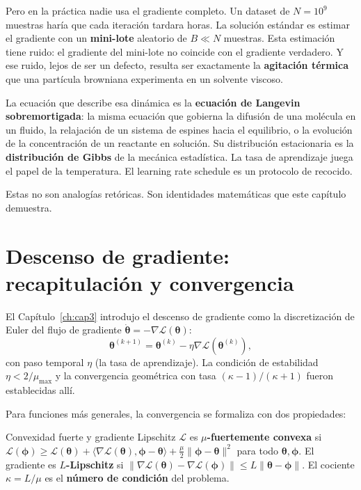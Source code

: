 Pero en la práctica nadie usa el gradiente completo. Un dataset de $N = 10^9$
muestras haría que cada iteración tardara horas. La solución estándar es
estimar el gradiente con un \textbf{mini-lote} aleatorio de $B \ll N$
muestras. Esta estimación tiene ruido: el gradiente del mini-lote no
coincide con el gradiente verdadero. Y ese ruido, lejos de ser un defecto,
resulta ser exactamente la \textbf{agitación térmica} que una partícula
browniana experimenta en un solvente viscoso.

La ecuación que describe esa dinámica es la \textbf{ecuación de Langevin
sobremortigada}: la misma ecuación que gobierna la difusión de una molécula
en un fluido, la relajación de un sistema de espines hacia el equilibrio, o
la evolución de la concentración de un reactante en solución. Su distribución
estacionaria es la \textbf{distribución de Gibbs} de la mecánica estadística.
La tasa de aprendizaje juega el papel de la temperatura. El learning rate
schedule es un protocolo de recocido.

Estas no son analogías retóricas. Son identidades matemáticas que este
capítulo demuestra.

\section{Descenso de gradiente: recapitulación y convergencia}
\label{sec:gd_recap}


El Capítulo~\ref{ch:cap3} introdujo el descenso de gradiente como la
discretización de Euler del flujo de gradiente
$\dot{\bm{\theta}} = -\nabla\mathcal{L}(\bm{\theta})$:
\begin{equation}
  \bm{\theta}^{(k+1)} = \bm{\theta}^{(k)}
  - \eta\nabla\mathcal{L}(\bm{\theta}^{(k)}),
  \label{eq:gd}
\end{equation}
con paso temporal $\eta$ (la tasa de aprendizaje). La condición de
estabilidad $\eta < 2/\mu_{\max}$ y la convergencia geométrica con tasa
$(\kappa-1)/(\kappa+1)$ fueron establecidas allí.

Para funciones más generales, la convergencia se formaliza con dos
propiedades:

\begin{definicion}{Convexidad fuerte y gradiente Lipschitz}
\label{def:fuerteconv}
$\mathcal{L}$ es \textbf{$\mu$-fuertemente convexa} si
$\mathcal{L}(\bm{\phi}) \geq \mathcal{L}(\bm{\theta}) +
\langle\nabla\mathcal{L}(\bm{\theta}),\bm{\phi}-\bm{\theta}\rangle +
\frac{\mu}{2}\|\bm{\phi}-\bm{\theta}\|^2$ para todo
$\bm{\theta},\bm{\phi}$. El gradiente es \textbf{$L$-Lipschitz} si
$\|\nabla\mathcal{L}(\bm{\theta})-\nabla\mathcal{L}(\bm{\phi})\| \leq
L\|\bm{\theta}-\bm{\phi}\|$. El cociente $\kappa = L/\mu$ es el
\textbf{número de condición} del problema.
\end{definicion}

